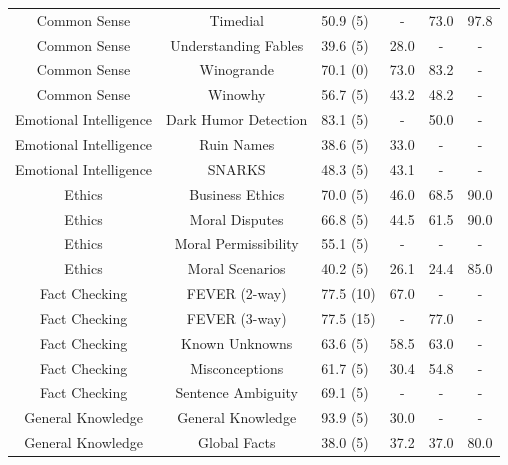 \documentclass[11pt, a4paper, logo, internal, copyright, nonumbering]{deepmind}
\begin{document}
\begin{center}
\begin{longtable}{cclccc}
           Common Sense &                              Timedial &   50.9 (5) &   - &  73.0 &         97.8 \\
           Common Sense &                Understanding Fables &   39.6 (5) &  28.0 &   - &          - \\
           Common Sense &                           Winogrande &   70.1 (0) &  73.0 &  83.2 &          -  \\
           Common Sense &                               Winowhy &   56.7 (5) &  43.2 &  48.2 &          - \\
 Emotional Intelligence &                  Dark Humor Detection &   83.1 (5) &   - &  50.0 &          - \\
 Emotional Intelligence &                            Ruin Names &   38.6 (5) &  33.0 &   - &          - \\
 Emotional Intelligence &                              SNARKS &   48.3 (5) &  43.1 &   - &          - \\
                 Ethics &                      Business Ethics &   70.0 (5) &  46.0 &  68.5 &         90.0 \\
                 Ethics &                       Moral Disputes &   66.8 (5) &  44.5 &  61.5 &         90.0 \\
                 Ethics &                  Moral Permissibility &   55.1 (5) &   - &   - &          - \\
                 Ethics &                      Moral Scenarios &   40.2 (5) &  26.1 &  24.4 &         85.0 \\
          Fact Checking &                        FEVER  (2-way) &   77.5 (10) &  67.0 &   - &          -  \\
          Fact Checking &                        FEVER  (3-way) &   77.5 (15) &   - &  77.0 &          -  \\
          Fact Checking &                      Known Unknowns &   63.6 (5) &  58.5 &  63.0 &          - \\
          Fact Checking &                        Misconceptions &   61.7 (5) &  30.4 &  54.8 &          - \\
          Fact Checking &                    Sentence Ambiguity &   69.1 (5) &   - &   - &          - \\
      General Knowledge &                     General Knowledge &   93.9 (5) &  30.0 &   - &          - \\
      General Knowledge &                         Global Facts &   38.0 (5) &  37.2 &  37.0 &         80.0 \\

\end{longtable}
\end{center}
\end{document}
